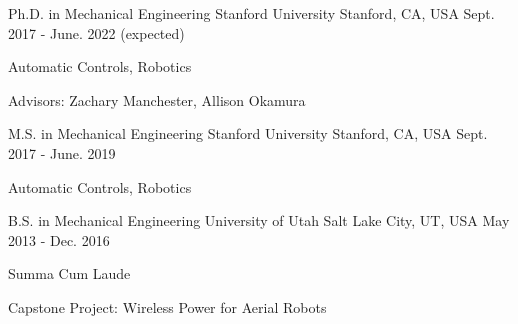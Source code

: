 

\begin{cventries}

  \cventry
     {Ph.D. in Mechanical Engineering} %
    {Stanford University} %
    {Stanford, CA, USA} %
    {Sept. 2017 - June. 2022 (expected)} %
    {
      \begin{cvitems} %
        \item {Automatic Controls, Robotics}
        \item {Advisors: Zachary Manchester, Allison Okamura}
      \end{cvitems}
    }
    
  \cventry
    {M.S. in Mechanical Engineering} %
    {Stanford University} %
    {Stanford, CA, USA} %
    {Sept. 2017 - June. 2019} %
    {
      \begin{cvitems} %
        \item {Automatic Controls, Robotics}
      \end{cvitems}
    }
    
  \cventry
    {B.S. in Mechanical Engineering} %
    {University of Utah} %
    {Salt Lake City, UT, USA} %
    {May 2013 - Dec. 2016} %
    {
      \begin{cvitems} %
        \item {Summa Cum Laude}
        \item {Capstone Project: Wireless Power for Aerial Robots}
      \end{cvitems}
    }

\end{cventries}
